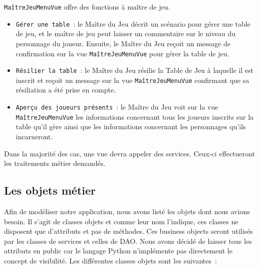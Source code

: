 \documentclass[11pt]{article}
\begin{document}
\texttt{MaîtreJeuMenuVue} offre des fonctions à maître de jeu.
\begin{itemize}[label=, font=\small]
    \item\texttt{Gérer une table}~: le Maître du Jeu décrit un scénario pour gérer une table de jeu, et le maître de jeu peut laisser un commentaire sur le niveau du personnage du joueur. Ensuite, le Maître du Jeu reçoit un message de confirmation sur la vue \texttt{MaîtreJeuMenuVue} pour gérer la table de jeu.
    \item\texttt{Résilier la table}~: le Maître du Jeu résilie la Table de Jeu à laquelle il est inscrit et reçoit un message sur la vue \texttt{MaîtreJeuMenuVue} confirmant que sa résiliation a été prise en compte.
    \item\texttt{Aperçu des joueurs présents}~: le Maître du Jeu voit sur la vue \texttt{MaîtreJeuMenuVue} les informations concernant tous les joueurs inscrits sur la table qu'il gère ainsi que les informations concernant les personnages qu'ils incarneront.
\end{itemize}


\bigbreak
Dans la majorité des cas, une vue devra appeler des services. Ceux-ci effectueront les traitements métier demandés.


\subsection{Les objets métier}

Afin de modéliser notre application, nous avons listé les objets dont nous avions besoin. Il s’agit de classes objets et comme leur nom l’indique, ces classes ne disposent que d’attributs et pas de méthodes. Ces business objects seront utilisés par les classes de services et celles de DAO. Nous avons décidé de laisser tous les attributs en public car le langage Python n'implémente pas directement le concept de visibilité. Les différentes classes objets sont les suivantes~:

\bigbreak
\end{document}
